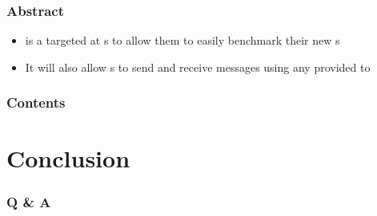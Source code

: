 \documentclass[aspectratio=169]{beamer}
\title[\tc]{\deliv{\srs}{Presentation}}
\date{\datesrs}
\begin{document}

\begin{frame}
\maketitle
\begin{center}
\names
\end{center}
\end{frame}

\begin{frame}
\frametitle{Abstract}
\begin{itemize}
\item \cry{} is a \cf{} targeted at \cg s to allow them to
easily benchmark their new \cs s
\item It will also allow \eu s to send and receive messages
using any \cs{} provided to \cry
\end{itemize}
\end{frame}

\begin{frame}
\frametitle{Contents}
\setlength{\columnsep}{0.11in}
\begin{multicols}{2}
\tableofcontents
\end{multicols}
\end{frame}








\section{Conclusion}
\begin{frame}
\frametitle{Q \& A}
\crygithub
\end{frame}

\end{document}
